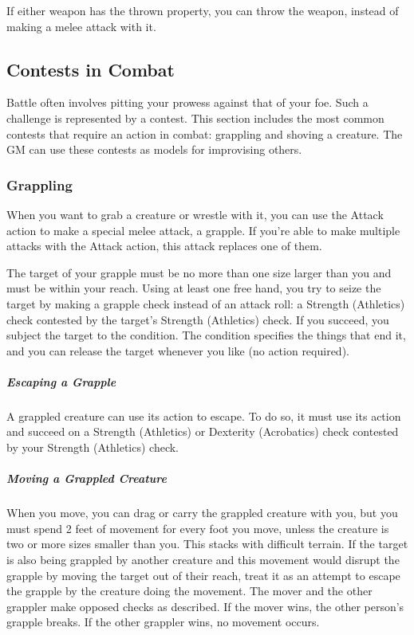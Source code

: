 If either weapon has the thrown property, you can throw the weapon, instead of making a melee attack with it.

\subsection{Contests in Combat}

Battle often involves pitting your prowess against that of your foe. Such a challenge is represented by a contest. This section includes the most common contests that require an action in combat: grappling and shoving a creature. The GM can use these contests as models for improvising others.

\subsubsection{Grappling}

When you want to grab a creature or wrestle with it, you can use the Attack action to make a special melee attack, a grapple. If you're able to make multiple attacks with the Attack action, this attack replaces one of them.

The target of your grapple must be no more than one size larger than you and must be within your reach. Using at least one free hand, you try to seize the target by making a grapple check instead of an attack roll: a Strength (Athletics) check contested by the target's Strength (Athletics) check. If you succeed, you subject the target to the  condition. The condition specifies the things that end it, and you can release the target whenever you like (no action required).

\subparagraph*{Escaping a Grapple} A grappled creature can use its action to escape. To do so, it must use its action and succeed on a Strength (Athletics) or Dexterity (Acrobatics) check contested by your Strength
(Athletics) check.

\subparagraph*{Moving a Grappled Creature} When you move, you can drag or carry the grappled creature with you, but you must spend 2 feet of movement for every foot you move, unless the creature is two or more sizes smaller than you. This stacks with difficult terrain. If the target is also being grappled by another creature and this movement would disrupt the grapple by moving the target out of their reach, treat it as an attempt to escape the grapple by the creature doing the movement. The mover and the other grappler make opposed checks as described. If the mover wins, the other person's grapple breaks. If the other grappler wins, no movement occurs.

